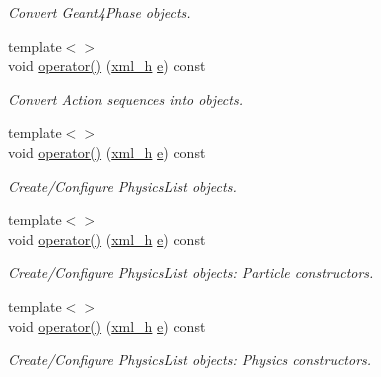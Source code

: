 \begin{DoxyCompactItemize}
\begin{DoxyCompactList}\small\item\em Convert Geant4\+Phase objects. \end{DoxyCompactList}\item 
{\footnotesize template$<$$>$ }\\void \hyperlink{struct_d_d4hep_1_1_converter_a478d8d37b4de2a798ac86925b24e069b}{operator()} (\hyperlink{_det_factory_helper_8h_ac13b3c79d2bc9214ff0cf5b8dc43dda6}{xml\+\_\+h} \hyperlink{_volumes_8cpp_a8a9a1f93e9b09afccaec215310e64142}{e}) const
\begin{DoxyCompactList}\small\item\em Convert Action sequences into objects. \end{DoxyCompactList}\item 
{\footnotesize template$<$$>$ }\\void \hyperlink{struct_d_d4hep_1_1_converter_ac2d5e7edfbb4f7ee0baf6e27db8fff03}{operator()} (\hyperlink{_det_factory_helper_8h_ac13b3c79d2bc9214ff0cf5b8dc43dda6}{xml\+\_\+h} \hyperlink{_volumes_8cpp_a8a9a1f93e9b09afccaec215310e64142}{e}) const
\begin{DoxyCompactList}\small\item\em Create/\+Configure Physics\+List objects. \end{DoxyCompactList}\item 
{\footnotesize template$<$$>$ }\\void \hyperlink{struct_d_d4hep_1_1_converter_aee7bfc16de1078524f497854edd74edc}{operator()} (\hyperlink{_det_factory_helper_8h_ac13b3c79d2bc9214ff0cf5b8dc43dda6}{xml\+\_\+h} \hyperlink{_volumes_8cpp_a8a9a1f93e9b09afccaec215310e64142}{e}) const
\begin{DoxyCompactList}\small\item\em Create/\+Configure Physics\+List objects\+: Particle constructors. \end{DoxyCompactList}\item 
{\footnotesize template$<$$>$ }\\void \hyperlink{struct_d_d4hep_1_1_converter_adf49930685453dda935ba66eedbf40de}{operator()} (\hyperlink{_det_factory_helper_8h_ac13b3c79d2bc9214ff0cf5b8dc43dda6}{xml\+\_\+h} \hyperlink{_volumes_8cpp_a8a9a1f93e9b09afccaec215310e64142}{e}) const
\begin{DoxyCompactList}\small\item\em Create/\+Configure Physics\+List objects\+: Physics constructors. \end{DoxyCompactList}\item 

\end{DoxyCompactItemize}
